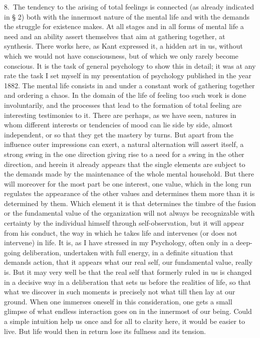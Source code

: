 \documentclass[12pt]{book}
\newcommand{\opage}[1]{\marginnote{\footnotesize\textit{[#1]}}}
\begin{document}
8.~The tendency to the arising of total feelings is connected (as already
indicated in § 2) both with the innermost nature of the mental life and with the
demands the struggle for existence makes. At all stages and in all forms of
mental life a need and an ability assert themselves that aim at gathering
together, at synthesis. There works here, as Kant expressed it, a hidden art in
us, without which we would not have consciousness, but of which we only rarely
become conscious. It is the task of general psychology to show this in detail; it
was at any rate the task I set myself in my presentation of psychology published
in the year 1882. The mental life consists in and under a constant work of
gathering together and ordering a chaos. In the domain of the life of feeling too
such work is done involuntarily, and the processes that lead to the formation of
total feeling are interesting testimonies to it. There are perhaps, as we have
seen, natures in whom different interests or tendencies of mood can lie side by
side, almost independent, or so that they get the mastery by turns. But apart
from the influence outer impressions can exert, a natural alternation will assert
itself, a strong swing in the one direction giving rise to a need for a swing in
the other direction, and herein it already appears that the single elements are
subject to the demands made by the maintenance of the whole mental household. But
there will moreover for the most part be one interest, one value, which in the
long run regulates \opage{35}the appearance of the other values and determines
them more than it is determined by them. Which element it is that determines the
timbre of the fusion or the fundamental value of the organization will not always
be recognizable with certainty by the individual himself through
self-observation, but it will appear from his conduct, the way in which he takes
life and intervenes (or does not intervene) in life. It is, as I have stressed in
my Psychology, often only in a deep-going deliberation, undertaken with full
energy, in a definite situation that demands action, that it appears what our
real self, our fundamental value, really is. But it may very well be that the
real self that formerly ruled in us is changed in a decisive way in a
deliberation that sets us before the realities of life, so that what we discover
in such moments is precisely not what till then lay at our ground. When one
immerses oneself in this consideration, one gets a small glimpse of what endless
interaction goes on in the innermost of our being. Could a simple intuition help
us once and for all to clarity here, it would be easier to live. But life would
then in return lose its fullness and its tension.
\end{document}
